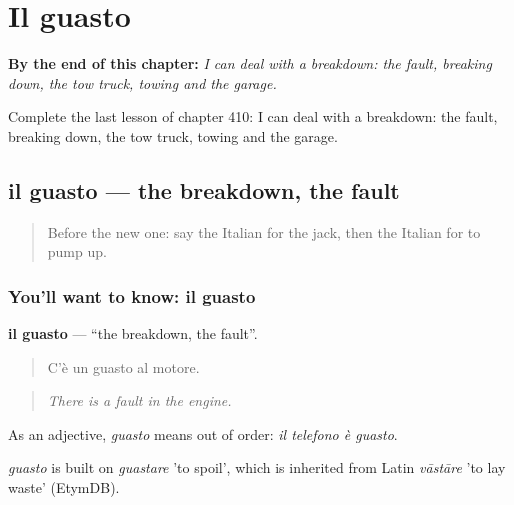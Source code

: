 
\chapter{Il guasto}
\label{ch:it-il-guasto}

\begin{chapteropening}
\textbf{By the end of this chapter:} \emph{I can deal with a breakdown: the fault, breaking down, the tow truck, towing and the garage.}

Complete the last lesson of chapter 410: I can deal with a breakdown: the fault, breaking down, the tow truck, towing and the garage.
\end{chapteropening}

\section[il guasto]{il guasto — the breakdown, the fault}

\label{lesson:IT-C410-guasto}



\begin{quote}
Before the new one: say the Italian for the jack, then the Italian for to pump up.
\end{quote}

\subsection*{You'll want to know: il guasto}
\textbf{il guasto} — \textquotedblleft{}the breakdown, the fault\textquotedblright{}.

\begin{quote}
C'è un guasto al motore.
\end{quote}

\begin{quote}
\emph{There is a fault in the engine.}
\end{quote}

As an adjective, \emph{guasto} means out of order: \emph{il telefono è guasto}.

\begin{cousinweb}
\emph{guasto} is built on \emph{guastare} 'to spoil', which is inherited from Latin \emph{vāstāre} 'to lay waste' (EtymDB).
\end{cousinweb}

